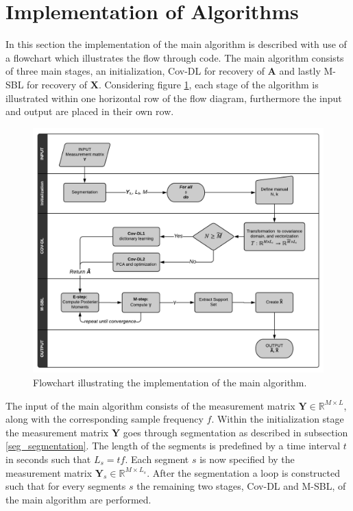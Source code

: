 \section{Implementation of Algorithms}\label{sec:implementation_flow}
In this section the implementation of the main algorithm is described with use of a flowchart which illustrates the flow through code.
The main algorithm consists of three main stages, an initialization, Cov-DL for recovery of $\mathbf{A}$ and lastly M-SBL for recovery of $\mathbf{X}$. 
Considering figure \ref{fig:flow}, each stage of the algorithm is illustrated within one horizontal row of the flow diagram, furthermore the input and output are placed in their own row.    
\begin{figure}[H]
\centering
\includegraphics[scale=0.7]{figures/ch_6/baseline_flowchart.png}
\caption{Flowchart illustrating the implementation of the main algorithm.}
\label{fig:flow}
\end{figure}
\noindent
The input of the main algorithm consists of the measurement matrix $\mathbf{Y} \in \mathbb{R}^{M \times L}$, along with the corresponding sample frequency $f$. 
Within the initialization stage the measurement matrix $\mathbf{Y}$ goes through segmentation as described in subsection \ref{seg_segmentation}. 
The length of the segments is predefined by a time interval $t$ in seconds such that $L_{s} = tf$. 
Each segment $s$ is now specified by the measurement matrix $\mathbf{Y}_s \in \mathbb{R}^{M \times L_{s}}$.
After the segmentation a loop is constructed such that for every segments $s$ the remaining two stages, Cov-DL and M-SBL, of the main algorithm are performed. 
